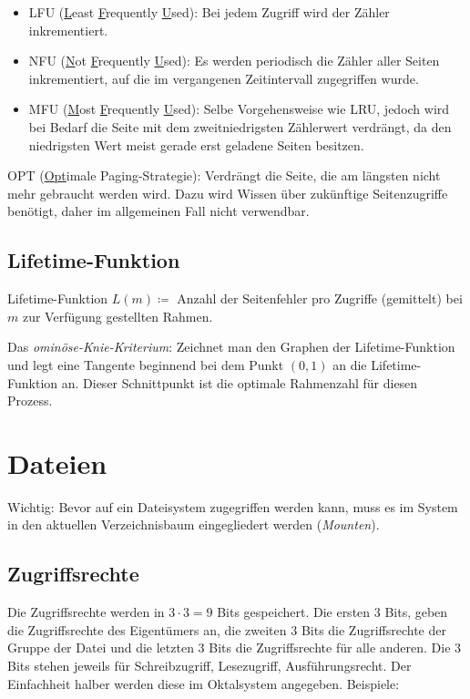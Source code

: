 \documentclass[11pt]{scrartcl}
\begin{document}
\begin{itemize}
{    \begin{itemize}
    	\item{LFU (\underline Least \underline Frequently \underline Used): Bei jedem Zugriff wird der Zähler inkrementiert.}
        \item{NFU (\underline Not \underline Frequently \underline Used): Es werden periodisch die Zähler aller Seiten inkrementiert, auf die im vergangenen Zeitintervall zugegriffen wurde.}
        \item{MFU (\underline Most \underline Frequently \underline Used): Selbe Vorgehensweise wie LRU, jedoch wird bei Bedarf die Seite mit dem zweitniedrigsten Zählerwert verdrängt, da den niedrigsten Wert meist gerade erst geladene Seiten besitzen.}
	\end{itemize}
    \item{OPT (\underline{Opt}imale Paging-Strategie): Verdrängt die Seite, die am längsten nicht mehr gebraucht werden wird. Dazu wird Wissen über zukünftige Seitenzugriffe benötigt, daher im allgemeinen Fall nicht verwendbar.}
    }
\end{itemize}

\subsection{Lifetime-Funktion} %
Lifetime-Funktion $L(m) \coloneqq$ Anzahl der Seitenfehler pro Zugriffe (gemittelt) bei $m$ zur Verfügung gestellten Rahmen.

Das \textit{ominöse-Knie-Kriterium}: Zeichnet man den Graphen der Lifetime-Funktion und legt eine Tangente beginnend bei dem Punkt $(0,1)$ an die Lifetime-Funktion an. Dieser Schnittpunkt ist die optimale Rahmenzahl für diesen Prozess.

\section{Dateien}
Wichtig: Bevor auf ein Dateisystem zugegriffen werden kann, muss es im System in den aktuellen Verzeichnisbaum eingegliedert werden (\textit{Mounten}).

\subsection{Zugriffsrechte}
Die Zugriffsrechte werden in $3 \cdot 3 = 9$ Bits gespeichert. Die ersten 3 Bits, geben die Zugriffsrechte des Eigentümers an, die zweiten 3 Bits die Zugriffsrechte der Gruppe der Datei und die letzten 3 Bits die Zugriffsrechte für alle anderen. Die 3 Bits stehen jeweils für Schreibzugriff, Lesezugriff, Ausführungsrecht. Der Einfachheit halber werden diese im Oktalsystem angegeben. Beispiele:
\end{document}
